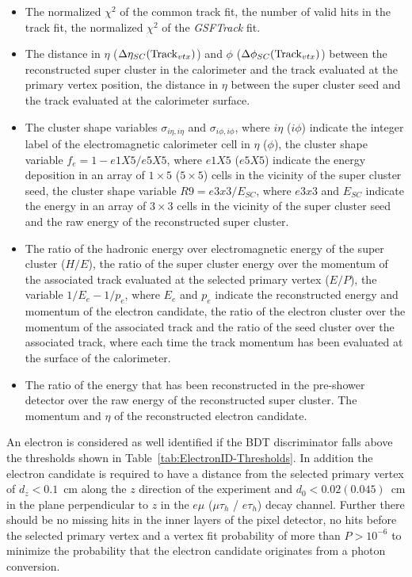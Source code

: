 \begin{itemize}
\item
The normalized $\chi^{2}$ of the common track fit, the number of valid hits in the track fit, the normalized
$\chi^{2}$ of the {\it GSFTrack} fit.
\item
The distance in $\eta$ ($\Delta\eta_{SC}({\rm Track}_{vtx})$) and $\phi$ ($\Delta\phi_{SC}({\rm Track}_{vtx})$)
between the reconstructed super cluster in the calorimeter and the track evaluated at the primary vertex
position, the distance in $\eta$ between the super cluster seed and the track evaluated at the calorimeter
surface.
\item
The cluster shape variables $\sigma_{i\eta,i\eta}$ and $\sigma_{i\phi, i\phi}$, where $i\eta$ ($i\phi$)
indicate the integer label of the electromagnetic calorimeter cell in $\eta$ ($\phi$), the cluster shape
variable $f_{e}=1-e1X5/e5X5$, where $e1X5$ ($e5X5$) indicate the energy deposition in an array of $1 \times 5$
($5 \times 5$) cells in the vicinity of the super cluster seed, the cluster shape variable $R9 = e3x3/E_{SC}$,
where $e3x3$ and $E_{SC}$ indicate the energy in an array of $3 \times 3$ cells in the vicinity of the
super cluster seed and the raw energy of the reconstructed super cluster.
\item
The ratio of the hadronic energy over electromagnetic energy of the super cluster ($H/E$), the ratio of
the super cluster energy over the momentum of the associated track evaluated at the selected primary vertex
($E/P$), the variable $1/E_{e}-1/p_{e}$, where $E_{e}$ and $p_{e}$ indicate the reconstructed energy and
momentum of the electron candidate, the ratio of the electron cluster over the momentum of the associated
track and the ratio of the seed cluster over the associated track, where each time the track momentum
has been evaluated at the surface of the calorimeter.
\item
The ratio of the energy that has been reconstructed in the pre-shower detector over the raw energy of
the reconstructed super cluster. The momentum and $\eta$ of the reconstructed electron candidate.
\end{itemize}

An electron is considered as well identified if the BDT discriminator falls above the thresholds shown
in Table~\ref{tab:ElectronID-Thresholds}\@. In addition the electron candidate is required to have a
distance from the selected primary vertex of $d_{z}<0.1$~cm along the $z$ direction of the experiment
 and $d_{0}<0.02 (0.045)$~cm in the plane perpendicular to $z$ in the $e\mu$ ($\mu\tau_{h}$ / $e\tau_{h}$)
decay channel. Further there should be no missing hits in the inner layers of the pixel detector, no
hits before the selected primary vertex and a vertex fit probability of more than $P>10^{-6}$ to minimize the probability that the electron candidate originates from a photon conversion.


